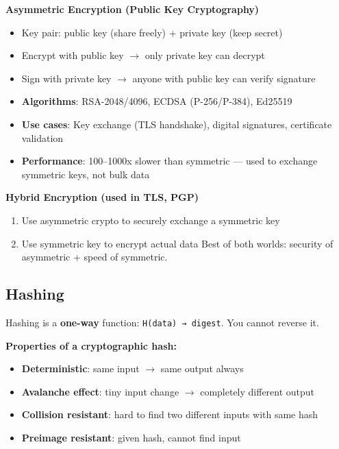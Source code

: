 \documentclass[11pt]{article}
\providecommand{\tightlist}{\setlength{\itemsep}{1pt}\setlength{\parskip}{0pt}}
\begin{document}
\textbf{Asymmetric Encryption (Public Key Cryptography)}

\begin{itemize}
\tightlist
\item
  Key pair: public key (share freely) + private key (keep secret)
\item
  Encrypt with public key \(\rightarrow\) only private key can decrypt
\item
  Sign with private key \(\rightarrow\) anyone with public key can verify signature
\item
  \textbf{Algorithms}: RSA-2048/4096, ECDSA (P-256/P-384), Ed25519
\item
  \textbf{Use cases}: Key exchange (TLS handshake), digital signatures, certificate validation
\item
  \textbf{Performance}: 100--1000x slower than symmetric --- used to exchange symmetric keys, not bulk data
\end{itemize}

\textbf{Hybrid Encryption (used in TLS, PGP)}

\begin{enumerate}
\def\labelenumi{\arabic{enumi}.}
\tightlist
\item
  Use asymmetric crypto to securely exchange a symmetric key
\item
  Use symmetric key to encrypt actual data
  Best of both worlds: security of asymmetric + speed of symmetric.
\end{enumerate}

\subsection{Hashing}\label{hashing}

Hashing is a \textbf{one-way} function: \texttt{H(data)\ →\ digest}. You cannot reverse it.

\textbf{Properties of a cryptographic hash:}

\begin{itemize}
\tightlist
\item
  \textbf{Deterministic}: same input \(\rightarrow\) same output always
\item
  \textbf{Avalanche effect}: tiny input change \(\rightarrow\) completely different output
\item
  \textbf{Collision resistant}: hard to find two different inputs with same hash
\item
  \textbf{Preimage resistant}: given hash, cannot find input
\end{itemize}
\end{document}
